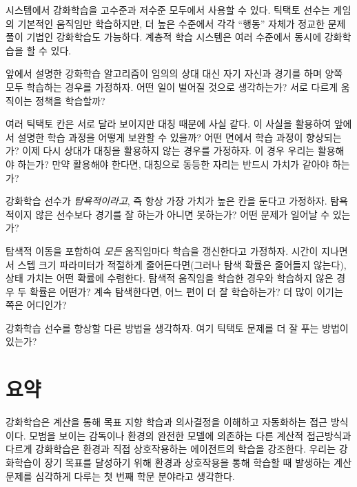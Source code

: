 시스템에서 강화학습을 고수준과 저수준 모두에서 사용할 수 있다. 틱택토 선수는
게임의 기본적인 움직임만 학습하지만, 더 높은 수준에서 각각 ``행동'' 자체가
정교한 문제 풀이 기법인 강화학습도 가능하다. 계층적 학습 시스템은 여러 수준에서
동시에 강화학습을 할 수 있다.

\begin{exercise}
앞에서 설명한 강화학습 알고리즘이 임의의 상대 대신 자기 자신과 경기를 하며 양쪽
모두 학습하는 경우를 가정하자. 어떤 일이 벌어질 것으로 생각하는가? 서로 다르게
움직이는 정책을 학습할까?
\end{exercise}

\begin{exercise}[대칭]
여러 틱택토 칸은 서로 달라 보이지만 대칭 때문에 사실 같다. 이 사실을 활용하여
앞에서 설명한 학습 과정을 어떻게 보완할 수 있을까? 어떤 면에서 학습 과정이
향상되는가? 이제 다시 상대가 대칭을 활용하지 않는 경우를 가정하자. 이 경우
우리는 활용해야 하는가? 만약 활용해야 한다면, 대칭으로 동등한 자리는 반드시
가치가 같아야 하는가?
\end{exercise}

\begin{exercise}[탐욕적인 경기]
강화학습 선수가 \emph{탐욕적이라고}, 즉 항상 가장 가치가 높은 칸을 둔다고
가정하자. 탐욕적이지 않은 선수보다 경기를 잘 하는가 아니면 못하는가? 어떤 문제가
일어날 수 있는가?
\end{exercise}

\begin{exercise}[탐색을 통한 학습]
탐색적 이동을 포함하여 \emph{모든} 움직임마다 학습을 갱신한다고 가정하자. 시간이
지나면서 스텝 크기 파라미터가 적절하게 줄어든다면(그러나 탐색 확률은 줄어들지
않는다), 상태 가치는 어떤 확률에 수렴한다. 탐색적 움직임을 학습한 경우와
학습하지 않은 경우 두 확률은 어떤가? 계속 탐색한다면, 어느 편이 더 잘
학습하는가? 더 많이 이기는 쪽은 어디인가?
\end{exercise}

\begin{exercise}[다른 개선점]
강화학습 선수를 향상할 다른 방법을 생각하자. 여기 틱택토 문제를 더 잘 푸는
방법이 있는가?
\end{exercise}

\section{요약}

강화학습은 계산을 통해 목표 지향 학습과 의사결정을 이해하고 자동화하는 접근
방식이다. 모범을 보이는 감독이나 환경의 완전한 모델에 의존하는 다른 계산적
접근방식과 다르게 강화학습은 환경과 직접 상호작용하는 에이전트의 학습을
강조한다. 우리는 강화학습이 장기 목표를 달성하기 위해 환경과 상호작용을 통해
학습할 때 발생하는 계산 문제를 심각하게 다루는 첫 번째 학문 분야라고 생각한다.

